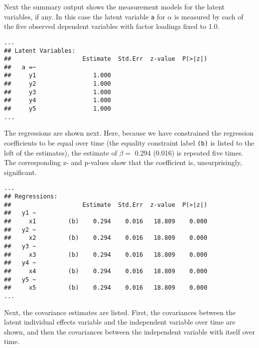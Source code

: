 \documentclass[]{interact}
\theoremstyle{plain}%
\theoremstyle{definition}
\theoremstyle{remark}
\begin{document}
Next the summary output shows the measurement models for the latent
variables, if any. In this case the latent variable \texttt{a} for
\(\alpha\) is measured by each of the five observed dependent variables
with factor loadings fixed to 1.0.

\singlespacing

\begin{verbatim}
...
## Latent Variables:
##                    Estimate  Std.Err  z-value  P(>|z|)
##   a =~                                                
##     y1                1.000                           
##     y2                1.000                           
##     y3                1.000                           
##     y4                1.000                           
##     y5                1.000                           
...
\end{verbatim}

\doublespacing

The regressions are shown next. Here, because we have constrained the
regression coefficients to be equal over time (the equality constraint
label \texttt{(b)} is listed to the left of the estimates), the estimate
of \(\beta =\) 0.294 (0.016) is repeated five times. The corresponding
z- and p-values show that the coefficient is, unsurprisingly,
significant.

\singlespacing

\begin{verbatim}
...
## Regressions:
##                    Estimate  Std.Err  z-value  P(>|z|)
##   y1 ~                                                
##     x1         (b)    0.294    0.016   18.809    0.000
##   y2 ~                                                
##     x2         (b)    0.294    0.016   18.809    0.000
##   y3 ~                                                
##     x3         (b)    0.294    0.016   18.809    0.000
##   y4 ~                                                
##     x4         (b)    0.294    0.016   18.809    0.000
##   y5 ~                                                
##     x5         (b)    0.294    0.016   18.809    0.000
...
\end{verbatim}

\doublespacing

Next, the covariance estimates are listed. First, the covariances
between the latent individual effects variable and the independent
variable over time are shown, and then the covariances between the
independent variable with itself over time.
\end{document}
